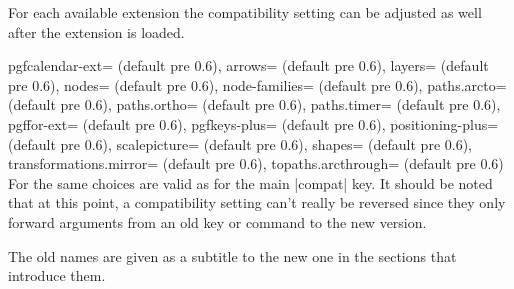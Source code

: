 \begin{multicols}{2}
\newcolumn\noindent
For each available extension the compatibility setting can be adjusted as well
after the extension is loaded.
\begin{keylist}{%
  pgfcalendar-ext= (default pre 0.6),
  arrows= (default pre 0.6),
  layers= (default pre 0.6),
  nodes= (default pre 0.6),
  node-families= (default pre 0.6),
  paths.arcto= (default pre 0.6),
  paths.ortho= (default pre 0.6),
  paths.timer= (default pre 0.6),
  pgffor-ext= (default pre 0.6),
  pgfkeys-plus= (default pre 0.6),
  positioning-plus= (default pre 0.6),
  scalepicture= (default pre 0.6),
  shapes= (default pre 0.6),
  transformations.mirror= (default pre 0.6),
  topaths.arcthrough= (default pre 0.6)%
}
  For  the same choices are valid as for the main |compat| key.
  It should be noted that at this point, a compatibility setting can't really be reversed
  since they only forward arguments from an old key or command to the new version.
  
  The old names are given as a subtitle to the new one in the sections that introduce them.
\end{keylist}
\end{multicols}